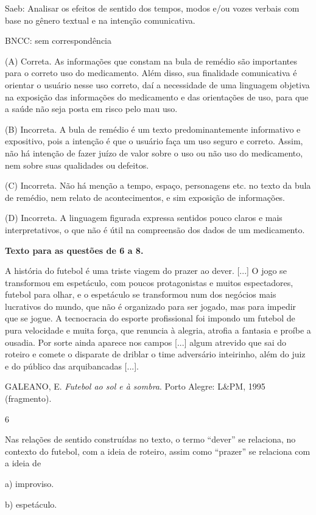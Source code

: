 Saeb: Analisar os efeitos de sentido dos tempos, modos e/ou vozes
verbais com base no gênero textual e na intenção comunicativa.

BNCC: sem correspondência

(A) Correta. As informações que constam na bula de remédio são
importantes para o correto uso do medicamento. Além disso, sua
finalidade comunicativa é orientar o usuário nesse uso correto, daí a
necessidade de uma linguagem objetiva na exposição das informações do
medicamento e das orientações de uso, para que a saúde não seja posta em
risco pelo mau uso.

(B) Incorreta. A bula de remédio é um texto predominantemente
informativo e expositivo, pois a intenção é que o usuário faça um uso
seguro e correto. Assim, não há intenção de fazer juízo de valor sobre o
uso ou não uso do medicamento, nem sobre suas qualidades ou defeitos.

(C) Incorreta. Não há menção a tempo, espaço, personagens etc. no texto
da bula de remédio, nem relato de acontecimentos, e sim exposição de
informações.

(D) Incorreta. A linguagem figurada expressa sentidos pouco claros e
mais interpretativos, o que não é útil na compreensão dos dados de um
medicamento.

\textbf{Texto para as questões de 6 a 8.}

A história do futebol é uma triste viagem do prazer ao dever. {[}...{]}
O jogo se transformou em espetáculo, com poucos protagonistas e muitos
espectadores, futebol para olhar, e o espetáculo se transformou num dos
negócios mais lucrativos do mundo, que não é organizado para ser jogado,
mas para impedir que se jogue. A tecnocracia do esporte profissional foi
impondo um futebol de pura velocidade e muita força, que renuncia à
alegria, atrofia a fantasia e proíbe a ousadia. Por sorte ainda aparece
nos campos {[}...{]} algum atrevido que sai do roteiro e comete o
disparate de driblar o time adversário inteirinho, além do juiz e do
público das arquibancadas {[}...{]}.

GALEANO, E. \emph{Futebol ao sol e à sombra}. Porto Alegre: L\&PM, 1995
(fragmento).

\num{6}

Nas relações de sentido construídas no texto, o termo ``dever'' se
relaciona, no contexto do futebol, com a ideia de roteiro, assim como
``prazer'' se relaciona com a ideia de

a) improviso.

b) espetáculo.

